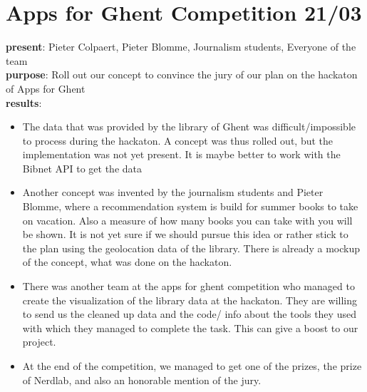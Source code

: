 \section{Apps for Ghent Competition 21/03}
{\bf present}: Pieter Colpaert, Pieter Blomme, Journalism students, Everyone of the team\\
{\bf purpose}: Roll out our concept to convince the jury of our plan on the hackaton of Apps for Ghent\\
{\bf results}: 
\begin{itemize}
  \item The data that was provided by the library of Ghent was difficult/impossible to process during the hackaton. A concept was thus rolled out, but the implementation was not yet present. It is maybe better to work with the Bibnet API to get the data
  \item Another concept was invented by the journalism students and Pieter Blomme, where a recommendation system is build for summer books to take on vacation. Also a measure of how many books you can take with you will be shown. It is not yet sure if we should pursue this idea or rather stick to the plan using the geolocation data of the library. There is already a mockup of the concept, what was done on the hackaton.
  \item There was another team at the apps for ghent competition who managed to create the visualization of the library data at the hackaton. They are willing to send us the cleaned up data and the code/ info about the tools they used with which they managed to complete the task. This can give a boost to our project.
  \item At the end of the competition, we managed to get one of the prizes, the prize of Nerdlab, and also an honorable mention of the jury.
\end{itemize}